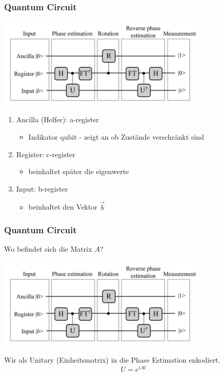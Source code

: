     \begin{frame}
    \frametitle{Quantum Circuit}
    \begin{center}
    \includegraphics[width=10cm]{img/hhl_circuit.jpg}
    \end{center}

    \begin{enumerate}
        \item Ancilla (Helfer): a-register
        \begin{itemize}
            \item Indikator qubit - zeigt an ob Zustände verschränkt sind
        \end{itemize}

        \item Register: c-register
        \begin{itemize}
            \item beinhaltet später die eigenwerte
        \end{itemize}
        
        \item Input: b-register 
        \begin{itemize}
            \item beinhaltet den Vektor $\vec{b}$
        \end{itemize}
        
    \end{enumerate}
   \end{frame}

\begin{frame}
    \frametitle{Quantum Circuit}
    \hfil

    Wo befindet sich die Matrix $A$?
    \begin{center}
    \includegraphics[width=10cm]{img/hhl_circuit.jpg}
    \end{center}

    \hfil
    Wir als Unitary (Einheitsmatrix) in die Phase Estimation enkodiert.
    $$U = e^{iAt}$$
   \end{frame}

